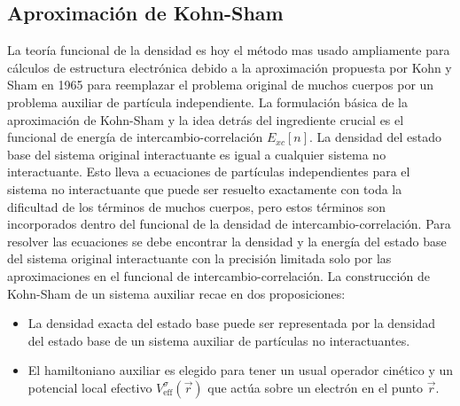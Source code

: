 

\subsection{Aproximación de Kohn-Sham}

La teoría funcional de la densidad es hoy el método mas usado ampliamente para cálculos de estructura electrónica debido a la aproximación propuesta por Kohn y Sham en 1965\cite{Kohn1965Self-consistentEffects} para reemplazar el problema original de muchos cuerpos por un problema auxiliar de partícula independiente. La formulación básica de la aproximación de Kohn-Sham y la idea detrás del ingrediente crucial es el funcional de energía de intercambio-correlación $E_{xc}[n]$. La densidad del estado base del sistema original interactuante es igual a cualquier sistema no interactuante. Esto lleva a ecuaciones de partículas independientes para el sistema no interactuante que puede ser resuelto exactamente con toda la dificultad de los términos de muchos cuerpos, pero estos términos son incorporados dentro del funcional de la densidad de intercambio-correlación. Para resolver las ecuaciones se debe encontrar la densidad y la energía del estado base del sistema original interactuante con la precisión limitada solo por las aproximaciones en el funcional de intercambio-correlación\cite{martin_2004}. La construcción de Kohn-Sham de un sistema auxiliar recae en dos proposiciones:

\begin{itemize}
    \item La densidad exacta del estado base puede ser representada por la densidad del estado base de un sistema auxiliar de partículas no interactuantes. 
    \item El hamiltoniano auxiliar es elegido para tener un usual operador cinético y un potencial local efectivo $V_{\text{eff}}^{\sigma}(\vec{r})$ que actúa sobre un electrón en el punto $\vec{r}$.
\end{itemize}

